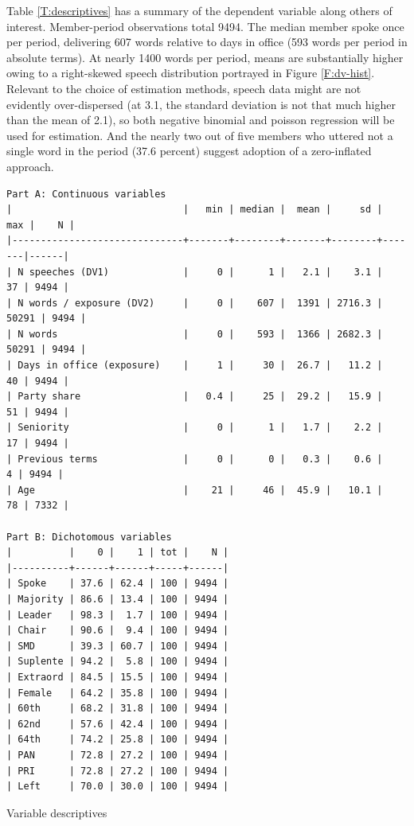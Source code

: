\documentclass[letter,12pt]{article}
\begin{document}
Table \ref{T:descriptives} has a summary of the dependent variable along others of interest. Member-period observations total 9494. The median member spoke once per period, delivering 607 words relative to days in office (593 words per period in absolute terms). At nearly 1400 words per period, means are substantially higher owing to a right-skewed speech distribution portrayed in Figure \ref{F:dv-hist}. Relevant to the choice of estimation methods, speech data might are not evidently over-dispersed (at 3.1, the standard deviation is not that much higher than the mean of 2.1), so both negative binomial and poisson regression will be used for estimation. And the nearly two out of five members who uttered not a single word in the period (37.6 percent) suggest adoption of a zero-inflated approach.

\begin{table}
  \begin{scriptsize}
    \begin{verbatim}
Part A: Continuous variables
|                              |   min | median |  mean |     sd |   max |    N |
|------------------------------+-------+--------+-------+--------+-------|------|
| N speeches (DV1)             |     0 |      1 |   2.1 |    3.1 |    37 | 9494 |
| N words / exposure (DV2)     |     0 |    607 |  1391 | 2716.3 | 50291 | 9494 |
| N words                      |     0 |    593 |  1366 | 2682.3 | 50291 | 9494 |
| Days in office (exposure)    |     1 |     30 |  26.7 |   11.2 |    40 | 9494 |
| Party share                  |   0.4 |     25 |  29.2 |   15.9 |    51 | 9494 |
| Seniority                    |     0 |      1 |   1.7 |    2.2 |    17 | 9494 |
| Previous terms               |     0 |      0 |   0.3 |    0.6 |     4 | 9494 |
| Age                          |    21 |     46 |  45.9 |   10.1 |    78 | 7332 |

Part B: Dichotomous variables
|          |    0 |    1 | tot |    N |
|----------+------+------+-----+------|
| Spoke    | 37.6 | 62.4 | 100 | 9494 |
| Majority | 86.6 | 13.4 | 100 | 9494 |
| Leader   | 98.3 |  1.7 | 100 | 9494 |
| Chair    | 90.6 |  9.4 | 100 | 9494 |
| SMD      | 39.3 | 60.7 | 100 | 9494 |
| Suplente | 94.2 |  5.8 | 100 | 9494 |
| Extraord | 84.5 | 15.5 | 100 | 9494 |
| Female   | 64.2 | 35.8 | 100 | 9494 |
| 60th     | 68.2 | 31.8 | 100 | 9494 |
| 62nd     | 57.6 | 42.4 | 100 | 9494 |
| 64th     | 74.2 | 25.8 | 100 | 9494 |
| PAN      | 72.8 | 27.2 | 100 | 9494 |
| PRI      | 72.8 | 27.2 | 100 | 9494 |
| Left     | 70.0 | 30.0 | 100 | 9494 |
    \end{verbatim}
  \end{scriptsize}
\caption{Variable descriptives}\label{T:descriptives}
\end{table}
\end{document}
